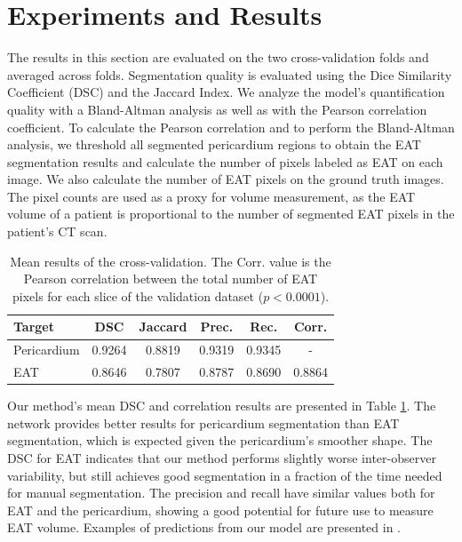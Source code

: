 \section{Experiments and Results}\label{experiment}

The results in this section are evaluated on the two cross-validation folds and averaged across folds. Segmentation quality is evaluated using the Dice Similarity Coefficient (DSC) and the Jaccard Index. We analyze the model's quantification quality with a Bland-Altman analysis \cite{MARTINBLAND1986307} as well as with the Pearson correlation coefficient. To calculate the Pearson correlation and to perform the Bland-Altman analysis, we threshold all segmented pericardium regions to obtain the EAT segmentation results and calculate the number of pixels labeled as EAT on each image. We also calculate the number of EAT pixels on the ground truth images. The pixel counts are used as a proxy for volume measurement, as the EAT volume of a patient is proportional to the number of segmented EAT pixels in the patient's CT scan.

\begin{table}[b!]
\renewcommand{\arraystretch}{1.4}
\caption{Mean results of the cross-validation. The Corr. value is the Pearson correlation between the total number of EAT pixels for each slice of the validation dataset ($p<0.0001$).}
\centering
\begin{tabularx}{\textwidth}{Xccccc} 
 Target & DSC & Jaccard & Prec. & Rec. & Corr. \\
 \hline
 Pericardium & 0.9264 & 0.8819 & 0.9319 & 0.9345 & - \\ 
 EAT & 0.8646 & 0.7807 & 0.8787 & 0.8690 & 0.8864 \\
\end{tabularx}
\label{tab:results}
\end{table}

Our method's mean DSC and correlation results are presented in Table \ref{tab:results}. The network provides better results for pericardium segmentation than EAT segmentation, which is expected given the pericardium's smoother shape. The DSC for EAT indicates that our method performs slightly worse inter-observer variability, but still achieves good segmentation in a fraction of the time needed for manual segmentation. The precision and recall have similar values both for EAT and the pericardium, showing a good potential for future use to measure EAT volume. Examples of predictions from our model are presented in .

